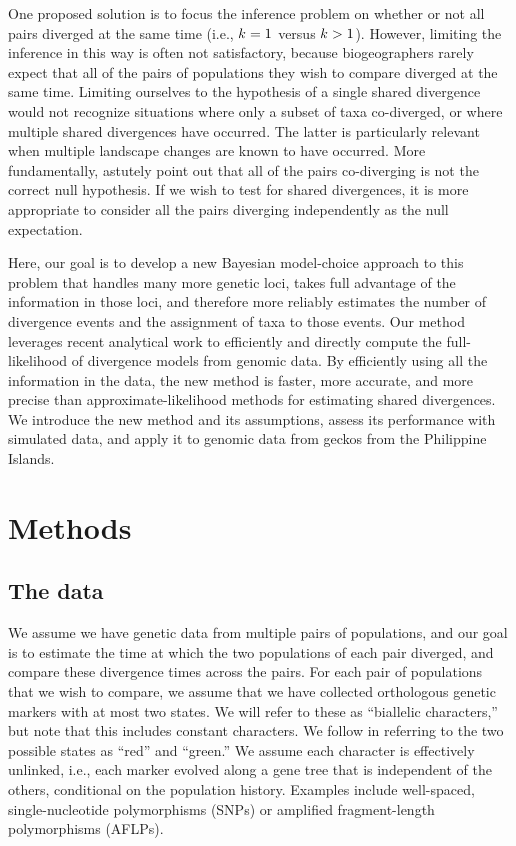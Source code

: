 One proposed solution is to focus the inference problem on whether or not all
pairs diverged at the same time (i.e., $k_{} = 1$ versus
$k_{} > 1$)\citep{Hickerson2013}.
However, limiting the inference in this way is often not satisfactory, because
biogeographers rarely expect that all of the pairs of populations they wish
to compare diverged at the same time.
Limiting ourselves to the hypothesis of a single shared divergence would not
recognize situations where only a subset of taxa co-diverged, or where multiple
shared divergences have occurred.
The latter is particularly relevant when multiple landscape changes are known
to have occurred.
More fundamentally,
\citet{Papadopoulou2016}
astutely point out that all of the pairs co-diverging is not the correct null
hypothesis.
If we wish to test for shared divergences, it is more appropriate to consider
all the pairs diverging independently as the null expectation.

Here, our goal is to develop a new Bayesian model-choice approach to this
problem that
handles many more genetic loci,
takes full advantage of the information in those loci,
and therefore more reliably
estimates the number of divergence events and the assignment of taxa to those
events.
Our method leverages recent analytical work \citep{Bryant2012} to efficiently
and directly compute the full-likelihood of divergence models from genomic
data.
By efficiently using all the information in the data, the new method is
faster,
more accurate,
and more precise
than approximate-likelihood methods for
estimating shared divergences.
We introduce the new method and its assumptions, assess its performance with
simulated data, and apply it to genomic data from geckos from the Philippine
Islands.


\section{Methods}

\subsection{The data}
We assume we have genetic data from multiple pairs of populations, and our goal
is to estimate the time at which the two populations of each pair diverged, and
compare these divergence times across the pairs.
For each pair of populations that we wish to compare, we assume that we have
collected orthologous genetic markers with at most two states.
We will refer to these as ``biallelic characters,'' but note that this includes
constant characters.
We follow \citet{Bryant2012} in referring to the two possible
states as ``red'' and ``green.''
We assume each character is effectively unlinked, i.e., each marker evolved
along a gene tree that is independent of the others, conditional on the
population history.
Examples include well-spaced, single-nucleotide polymorphisms (SNPs) or
amplified fragment-length polymorphisms (AFLPs).

